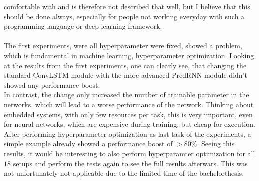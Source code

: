  comfortable with and is therefore not described that well, but I believe that this should be done always, especially for people not working everyday with such a 
 programming language or deep learning framework.
 \\\\
 The first experiments, were all hyperparameter were fixed, showed a problem, which is fundamental in machine learning, hyperparameter optimization. Looking at
 the results from the first experiments, one can clearly see, that changing the standard ConvLSTM module with the more advanced PredRNN module didn't
 showed any performance boost.\\In contrast, the change only increased the number of trainable parameter in the networks, which will lead to a worse performance
 of the network. Thinking about embedded systems, with only few resources per task, this is very important, even for neural networks, which are expensive during
 training, but cheap for execution. After performing hyperparameter optimization as last task of the experiments, a simple example already showed a performance
 boost of $> 80\%$. Seeing this results, it would be interesting to also perform hyperparamter optimization for all $18$ setups and perform the tests again to
 see the full results afterwars. This was not unfortunately not applicable due to the limited time of the bachelorthesis.